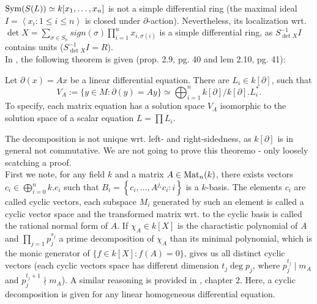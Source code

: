 \ed
\bmk $\mathrm{Sym}(S(L)) \simeq k[x_1,\ldots,x_n]$ is not a simple differential ring (the maximal ideal $I = \left<x_i : 1 \leq i \leq n\right>$ is closed under $\partial$-action). Nevertheless, its localization wrt. $\det X = \sum_{\sigma \in S_n} sign(\sigma) \prod_{i=1}^n x_{i,\sigma(i)}$ is a simple differential ring, as $S_{\det X}^{-1}I$ contains units ($S_{\det X}^{-1}I = R$).\\
\indent In \cite{vdPS01}, the following theorem is given (prop. 2.9, pg. 40 and lem 2.10, pg. 41):
\begin{satz}
Let $\partial(x) = A x$ be a linear differential equation. There are $L_i \in k[\partial]$, such that
$$V_A := \{y \in M : \partial(y) = A y\} \simeq \bigoplus_{i=1}^n k[\partial]/k[\partial].L_i^*.$$
To specify, each matrix equation has a solution space $V_A$ isomorphic to the solution space of a scalar equation $L = \prod L_i$.
\end{satz}
The decomposition is not unique wrt. left- and right-sidedness, as $k[\partial]$ is in general not commutative. We are not going to prove this theoremo - only loosely scatching a proof.\\
First we note, for any field $k$ and a matrix $A \in \mathrm{Mat}_n(k)$, there exists vectors $c_i \in \bigoplus_{i=0}^n k.e_i$ such that $B_i = \left\{c_i,...,A^{j_i} c_i : i\right\}$ is a $k$-basis. The elements $c_i$ are called cyclic vectors, each subspace $M_i$ generated by such an element is called a cyclic vector space and the transformed matrix wrt. to the cyclic basis is called the rational normal form of $A$. If $\chi_A \in k[X]$ is the charactistic polynomial of $A$ and $\prod_{j = 1} p_j^{s_j}$ a prime decomposition of $\chi_A$ than its minimal polynomial, which is the monic generator of $\{f \in k[X] : f(A) = 0\}$, gives us all distinct cyclic vectors (each cyclic vectors space has different dimension $t_j \deg p_j$, where $p_j^{t_j} \mid m_A$ and $p_j^{t_j+1} \nmid m_A$). A similar reasoning is provided in \cite{vdPS01}, chapter 2. Here, a cyclic decomposition is given for any linear homogeneous differential equation.

